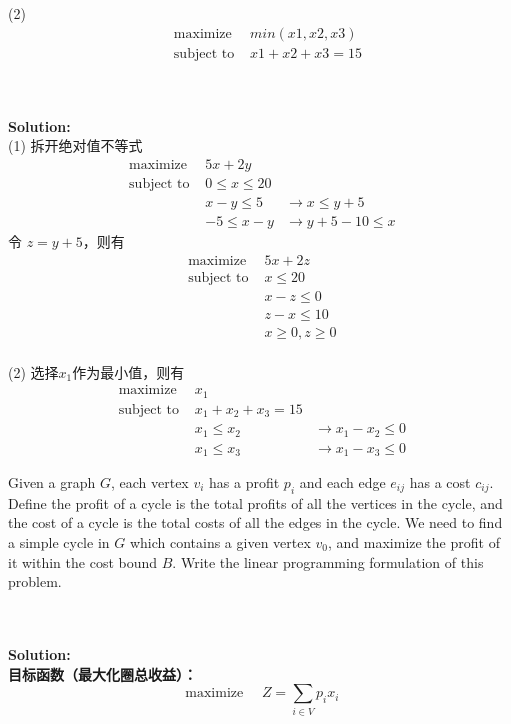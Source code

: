 \documentclass{article}
\newcounter{exercise}
\newcommand{\<}{
    \langle}
\renewcommand{\>}{
    \rangle}
\begin{document}
{\begin{exercise}
	(2)
		$$\begin{aligned}
		&\text { maximize }  & min(x1,x2,x3)\\
		&\text { subject to }  & x1+x2+x3 = 15
		\end{aligned}$$
\end{exercise}
\\\\
\noindent\textbf{Solution:}
\\
(1) 拆开绝对值不等式
$$\begin{aligned}
&\text { maximize } & 5x+2y &\\
&\text { subject to } & 0 \le x \le 20 &\\
& & x - y \le 5 & \rightarrow x \le y + 5 &\\
& & -5 \le x - y & \rightarrow y + 5 - 10 \le x
\end{aligned}$$
令 $z = y + 5$，则有
$$\begin{aligned}
&\text { maximize } & 5x+2z &\\
&\text { subject to } & x \le 20 &\\
& & x - z\le 0 &\\
& & z - x \le 10 &\\
& & x \ge 0, z \ge 0
\end{aligned}$$
\\
(2) 选择$x_1$作为最小值，则有
$$\begin{aligned}
&\text { maximize } & x_1 &\\
&\text { subject to } & x_1 + x_2 + x_3 = 15 &\\
& & x_1 \le x_2 & \rightarrow x_1 - x_2 \le 0 &\\
& & x_1 \le x_3 & \rightarrow x_1 - x_3 \le 0
\end{aligned}$$


\begin{exercise}
	Given a graph $G$, each vertex $v_i$ has a profit $p_i$ and each edge $e_{ij}$ has a cost $c_{ij}$. Define the profit of a cycle is the total profits of all the vertices in the cycle, and the cost of a cycle is the total costs of all the edges in the cycle. We need to find a simple cycle in $G$ which contains a given vertex $v_0$, and maximize the profit of it within the cost bound $B$. Write the linear programming formulation of this problem.
\end{exercise}
\\\\
\noindent\textbf{Solution:}
\\
\textbf{目标函数（最大化圈总收益）：}
\[
\text { maximize } \quad Z = \sum_{i \in V} p_i x_i
\]

}
\end{document}
